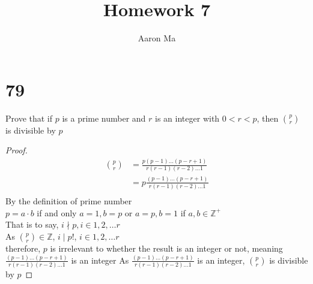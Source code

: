 \documentclass{article}
\title{Homework 7}
\author{Aaron Ma}
\begin{document}
\maketitle
\section{79}
Prove that if $p$ is a prime number and $r$ is an integer with $0<r<p$, then  ${p\choose r}$ is divisible by $p$\\
\begin{proof}
\begin{align*}
    p \choose r &= \frac{p(p-1) \ldots (p-r+1)}{r(r-1)(r-2)\ldots1} \tag{By definition of Combination}\\
    &= p\frac{(p-1) \ldots (p-r+1)}{r(r-1)(r-2)\ldots1} \tag{By algebra}\\
\end{align*}
By the definition of prime number\\
$p = a \cdot b$ if and only $a = 1, b = p$ or $a = p, b= 1$ if $a,b \in \mathbb{Z^+}$\\
That is to say, $i \nmid p, i\in {1,2,\ldots r}$\\
As ${p \choose r} \in \mathbb{Z}$, $i \mid p!$, $i \in {1,2,\ldots r}$\\
therefore, $p$ is irrelevant to whether the result is an integer or not, meaning $\frac{(p-1) \ldots (p-r+1)}{r(r-1)(r-2)\ldots1}$ is an integer
As $\frac{(p-1) \ldots (p-r+1)}{r(r-1)(r-2)\ldots1}$ is an integer, $p\choose r$ is divisible by $p$
\end{proof}
\end{document}

